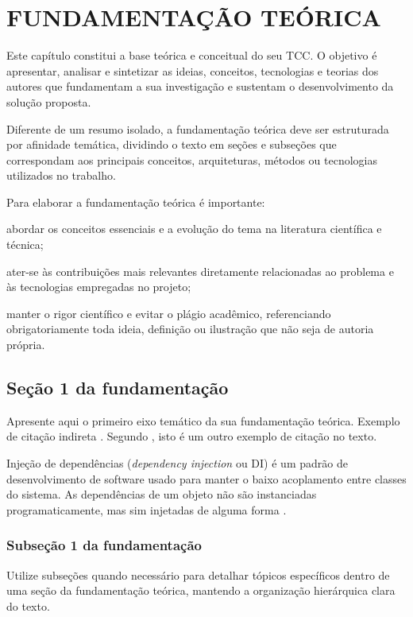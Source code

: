 \chapter{FUNDAMENTAÇÃO TEÓRICA}
Este capítulo constitui a base teórica e conceitual do seu TCC. O objetivo é apresentar, analisar e sintetizar as ideias, conceitos, tecnologias e teorias dos autores que fundamentam a sua investigação e sustentam o desenvolvimento da solução proposta.

Diferente de um resumo isolado, a fundamentação teórica deve ser estruturada por afinidade temática, dividindo o texto em seções e subseções que correspondam aos principais conceitos, arquiteturas, métodos ou tecnologias utilizados no trabalho.

Para elaborar a fundamentação teórica é importante:
\begin{uemaball}
    \item abordar os conceitos essenciais e a evolução do tema na literatura científica e técnica;
    \item ater-se às contribuições mais relevantes diretamente relacionadas ao problema e às tecnologias empregadas no projeto;
    \item manter o rigor científico e evitar o plágio acadêmico, referenciando obrigatoriamente toda ideia, definição ou ilustração que não seja de autoria própria.
\end{uemaball}

\section{Seção 1 da fundamentação}
Apresente aqui o primeiro eixo temático da sua fundamentação teórica. Exemplo de citação indireta \cite{towfic2022benchmarking}. Segundo , isto é um outro exemplo de citação no texto.

\begin{citacao}
Injeção de dependências (\textit{dependency injection} ou DI) é um padrão de
desenvolvimento de software usado para manter o baixo acoplamento entre classes do
sistema. As dependências de um objeto não são instanciadas programaticamente, mas
sim injetadas de alguma forma \cite{chambers2021macbook}.
\end{citacao}

\subsection{Subseção 1 da fundamentação}
Utilize subseções quando necessário para detalhar tópicos específicos dentro de uma seção da fundamentação teórica, mantendo a organização hierárquica clara do texto.


